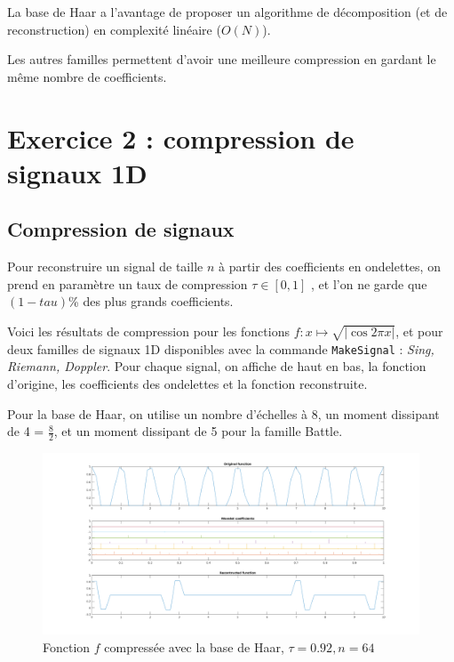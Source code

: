 \documentclass[a4paper,12pt, openany]{book}
\theoremstyle{break}
\begin{document}
La base de Haar a l'avantage de proposer un algorithme de décomposition (et de reconstruction) en complexité linéaire ($O(N)$).

Les autres familles permettent d'avoir une meilleure compression en gardant le même nombre de coefficients.


\section{Exercice 2 : compression de signaux 1D}
\subsection{Compression de signaux}

Pour reconstruire un signal de taille $n$ à partir des coefficients en ondelettes, on prend en paramètre un taux de compression $\tau \in [0,1]$ , et l'on ne garde que $(1-tau)$\% des plus grands coefficients.

Voici les résultats de compression pour les fonctions $f: x \mapsto \sqrt{| \cos{2\pi  x}|}$, et pour deux familles de signaux 1D disponibles avec la commande \texttt{MakeSignal} : \textit{Sing, Riemann, Doppler}. Pour chaque signal, on affiche de haut en bas, la fonction d'origine, les coefficients des ondelettes et la fonction reconstruite.

Pour la base de Haar, on utilise un nombre d'échelles à 8, un moment dissipant de 4 = $\frac{8}{2}$, et un moment dissipant de 5 pour la famille Battle.

\begin{figure}[H]
  \includegraphics[width=\textwidth]{compressHaar64points_taux_0_92}
  \caption{Fonction $f$ compressée avec la base de Haar, $\tau=0.92, n=64$}
\end{figure}
\end{document}
